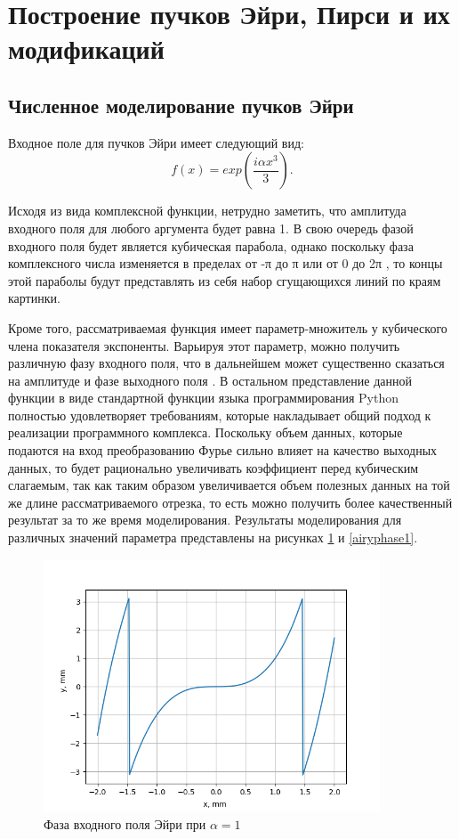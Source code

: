 	\section{Построение пучков Эйри, Пирси и их модификаций}{
	
	\subsection{Численное моделирование пучков Эйри}
		Входное поле для пучков Эйри имеет следующий вид:
		\begin{equation*} \label{}
	f(x) = exp(\frac{i \alpha x^3}{3}).
		\end{equation*}
		
	Исходя из вида комплексной функции, нетрудно заметить, что амплитуда
входного поля для любого аргумента будет равна 1. В свою очередь фазой
входного поля будет является кубическая парабола, однако поскольку фаза
комплексного числа изменяется в пределах от -π до π или от 0 до 2π , то концы
этой параболы будут представлять из себя набор сгущающихся линий по краям
картинки. 

	Кроме того, рассматриваемая функция имеет параметр-множитель у
кубического члена показателя экспоненты. Варьируя этот параметр, можно
получить различную фазу входного поля, что в дальнейшем может
существенно сказаться на амплитуде и фазе выходного поля \cite{Khonina_2011}. В остальном
представление данной функции в виде стандартной функции языка
программирования Python полностью удовлетворяет требованиям, которые
накладывает общий подход к реализации программного комплекса. 
	Поскольку объем данных, которые подаются на вход преобразованию
Фурье сильно влияет на качество выходных данных, то будет рационально
увеличивать коэффициент перед кубическим слагаемым, так как таким образом
увеличивается объем полезных данных на той же длине рассматриваемого
отрезка, то есть можно получить более качественный результат за то же время
моделирования. Результаты моделирования для различных значений параметра представлены на рисунках \ref{airy_phase} и \ref{airyphase1}.
	 \begin{figure}[H]
		  \begin{center}
			\includegraphics[width=10cm]{plots/airyphase}
	\caption{Фаза входного поля Эйри при $\alpha  = 1$}
		\label{airy_phase}
		 \end{center}
\end{figure}

}
